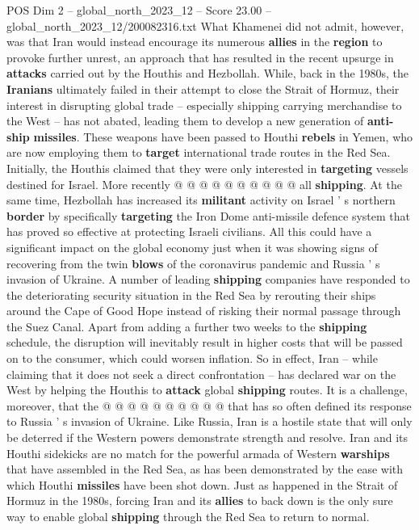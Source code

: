 \begin{textsample}{POS Dim 2 – global\_north\_2023\_12 – Score 23.00 – global\_north\_2023\_12/200082316.txt}
What Khamenei did not admit, however, was that Iran would instead encourage its numerous \textbf{allies} in the \textbf{region} to provoke further unrest, an approach that has resulted in the recent upsurge in \textbf{attacks} carried out by the Houthis and Hezbollah.
While, back in the 1980s, the \textbf{Iranians} ultimately failed in their attempt to close the Strait of Hormuz, their interest in disrupting global trade -- especially shipping carrying merchandise to the West -- has not abated, leading them to develop a new generation of \textbf{anti-ship} \textbf{missiles}.
These weapons have been passed to Houthi \textbf{rebels} in Yemen, who are now employing them to \textbf{target} international trade routes in the Red Sea.
Initially, the Houthis claimed that they were only interested in \textbf{targeting} vessels destined for Israel.
More recently @ @ @ @ @ @ @ @ @ @ all \textbf{shipping}.
At the same time, Hezbollah has increased its \textbf{militant} activity on Israel ' s northern \textbf{border} by specifically \textbf{targeting} the Iron Dome anti-missile defence system that has proved so effective at protecting Israeli civilians.
All this could have a significant impact on the global economy just when it was showing signs of recovering from the twin \textbf{blows} of the coronavirus pandemic and Russia ' s invasion of Ukraine.
A number of leading \textbf{shipping} companies have responded to the deteriorating security situation in the Red Sea by rerouting their ships around the Cape of Good Hope instead of risking their normal passage through the Suez Canal.
Apart from adding a further two weeks to the \textbf{shipping} schedule, the disruption will inevitably result in higher costs that will be passed on to the consumer, which could worsen inflation.
So in effect, Iran -- while claiming that it does not seek a direct confrontation -- has declared war on the West by helping the Houthis to \textbf{attack} global \textbf{shipping} routes.
It is a challenge, moreover, that the @ @ @ @ @ @ @ @ @ @ that has so often defined its response to Russia ' s invasion of Ukraine.
Like Russia, Iran is a hostile state that will only be deterred if the Western powers demonstrate strength and resolve.
Iran and its Houthi sidekicks are no match for the powerful armada of Western \textbf{warships} that have assembled in the Red Sea, as has been demonstrated by the ease with which Houthi \textbf{missiles} have been shot down.
Just as happened in the Strait of Hormuz in the 1980s, forcing Iran and its \textbf{allies} to back down is the only sure way to enable global \textbf{shipping} through the Red Sea to return to normal.

\end{textsample}
